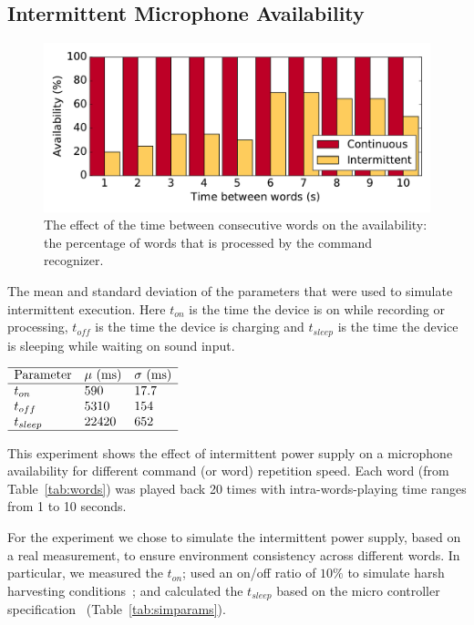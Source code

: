 \subsection{ Intermittent Microphone Availability}
%

\begin{figure}
\centering
\includegraphics[width=\linewidth]{figures/word_freq}
\caption{The effect of the time between consecutive words on the availability: the percentage of words that is processed by the command recognizer. }
\label{fig:word_freq}
\end{figure}
%
\begin{table}
	\centering
	\caption{The mean and standard deviation of the parameters that were used to simulate intermittent execution. Here $t_{on}$ is the time the device is on while recording or processing, $t_{off}$ is the time the device is charging and $t_{sleep}$ is the time the device is sleeping while waiting on sound input.}
	\label{tab:simparams}
$
\begin{array}{lll}\hline
\text{Parameter} & \mu \text{ (ms)} & \sigma \text{ (ms)} \\\hline
t_{on} &  590 & 17.7 \\
t_{off} & 5310 & 154 \\
t_{sleep} &  22420 & 652 \\\hline
\end{array}
$
\end{table}
%
This experiment shows the effect of intermittent power supply on a microphone availability  for different command (or word) repetition speed. Each word (from Table~\ref{tab:words}) was played back 20 times with intra-words-playing time ranges from 1 to 10 seconds. 

For the experiment we chose to simulate the intermittent power supply, based on a real measurement, to ensure environment consistency across different words.
In particular, we measured the $t_{on}$; used an on/off ratio of $10\%$ to simulate harsh harvesting conditions~\cite{mementos, harvOS,lucia}; and calculated the $t_{sleep}$ based on the micro controller specification~\cite{datasheet} (Table~\ref{tab:simparams}).     

